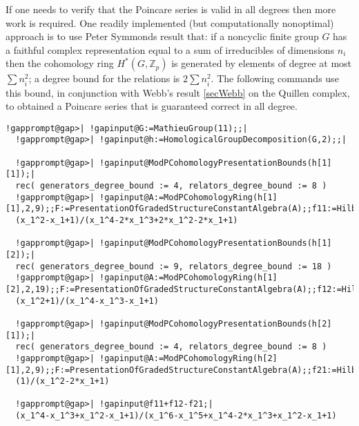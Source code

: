 \documentclass[a4paper,11pt]{report}
\begin{document}
{{\begin{Verbatim}[commandchars=!@|,fontsize=\small,frame=single,label=Example]
\end{Verbatim}
 If one needs to verify that the Poincare series is valid in all degrees then
more work is required. One readily implemented (but computationally
non\texttt{}optimal) approach is to use Peter Symmonds result \cite{Symmonds} that: if a non\texttt{}cyclic finite group $G$ has a faithful complex representation equal to a sum of irreducibles of
dimensions $n_i$ then the cohomology ring $H^\ast(G,\mathbb Z_p)$ is generated by elements of degree at most $\sum n_i^2$; a degree bound for the relations is $2 \sum n_i^2$. The following commands use this bound, in conjunction with Webb's result \ref{secWebb} on the Quillen complex, to obtained a Poincare series that is guaranteed
correct in all degree. 
\begin{Verbatim}[commandchars=!@|,fontsize=\small,frame=single,label=Example]
  !gapprompt@gap>| !gapinput@G:=MathieuGroup(11);;|
  !gapprompt@gap>| !gapinput@h:=HomologicalGroupDecomposition(G,2);;|
  
  !gapprompt@gap>| !gapinput@ModPCohomologyPresentationBounds(h[1][1]);|
  rec( generators_degree_bound := 4, relators_degree_bound := 8 )
  !gapprompt@gap>| !gapinput@A:=ModPCohomologyRing(h[1][1],2,9);;F:=PresentationOfGradedStructureConstantAlgebra(A);;f11:=HilbertPoincareSeries(F);|
  (x_1^2-x_1+1)/(x_1^4-2*x_1^3+2*x_1^2-2*x_1+1)
  
  !gapprompt@gap>| !gapinput@ModPCohomologyPresentationBounds(h[1][2]);|
  rec( generators_degree_bound := 9, relators_degree_bound := 18 )
  !gapprompt@gap>| !gapinput@A:=ModPCohomologyRing(h[1][2],2,19);;F:=PresentationOfGradedStructureConstantAlgebra(A);;f12:=HilbertPoincareSeries(F);|
  (x_1^2+1)/(x_1^4-x_1^3-x_1+1)
  
  !gapprompt@gap>| !gapinput@ModPCohomologyPresentationBounds(h[2][1]);|
  rec( generators_degree_bound := 4, relators_degree_bound := 8 )
  !gapprompt@gap>| !gapinput@A:=ModPCohomologyRing(h[2][1],2,9);;F:=PresentationOfGradedStructureConstantAlgebra(A);;f21:=HilbertPoincareSeries(F);|
  (1)/(x_1^2-2*x_1+1)
  
  !gapprompt@gap>| !gapinput@f11+f12-f21;|
  (x_1^4-x_1^3+x_1^2-x_1+1)/(x_1^6-x_1^5+x_1^4-2*x_1^3+x_1^2-x_1+1)
  
\end{Verbatim}
 
}}
\end{document}
